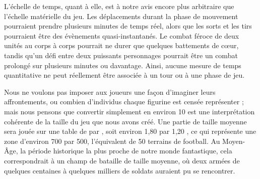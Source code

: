 L'échelle de temps, quant à elle, est à notre avis encore plus arbitraire que l'échelle matérielle du jeu. Les déplacements durant la phase de mouvement pourraient prendre plusieurs minutes de temps réel, alors que les sorts et les tirs pourraient être des évènements quasi-instantanés. Le combat féroce de deux unités au corps à corps pourrait ne durer que quelques battements de cœur, tandis qu'un défi entre deux puissants personnages pourrait être un combat prolongé sur plusieurs minutes ou davantage. Ainsi, aucune mesure de temps quantitative ne peut réellement être associée à un tour ou à une phase de jeu.

Nous ne voulons pas imposer aux joueurs une façon d'imaginer leurs affrontements, ou combien d'individus chaque figurine est censée représenter ; mais nous pensons que convertir simplement  en environ \unit{10}{\meter} est une interprétation cohérente de la taille du jeu que nous avons créé. Une partie de taille moyenne sera jouée sur une table de  par , soit environ 1,80 {\meter} par 1,20 {\meter}, ce qui représente une zone d'environ \unit{700}{\meter} par \unit{500}{\meter}, l'équivalent de 50 terrains de football. Au Moyen-Âge, la période historique la plus proche de notre monde fantastique, cela correspondrait à un champ de bataille de taille moyenne, où deux armées de quelques centaines à quelques milliers de soldats auraient pu se rencontrer.

